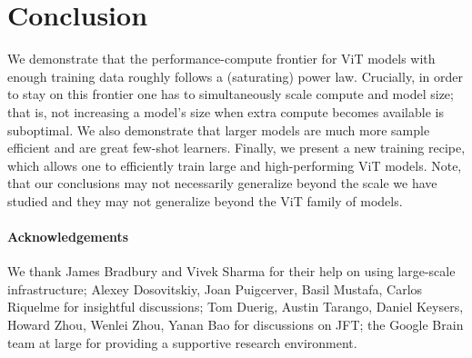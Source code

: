 \section{Conclusion}\label{sec:conclusion}

We demonstrate that the performance-compute frontier for ViT models with enough training data roughly follows a (saturating) power law. 
Crucially, in order to stay on this frontier one has to simultaneously scale compute and model size; that is, not increasing a model's size when extra compute becomes available is suboptimal. 
We also demonstrate that larger models are much more sample efficient and are great few-shot learners. 
Finally, we present a new training recipe, which allows one to efficiently train large and high-performing ViT models. Note, that our conclusions may not necessarily generalize beyond the scale we have studied and they may not generalize beyond the ViT family of models.
\paragraph{Acknowledgements} We thank James Bradbury and Vivek Sharma for their help on using large-scale infrastructure; Alexey Dosovitskiy, Joan Puigcerver, Basil Mustafa, Carlos Riquelme for insightful discussions; Tom Duerig, Austin Tarango, Daniel Keysers, Howard Zhou, Wenlei Zhou, Yanan Bao for discussions on JFT; the Google Brain team at large for providing a supportive research environment.